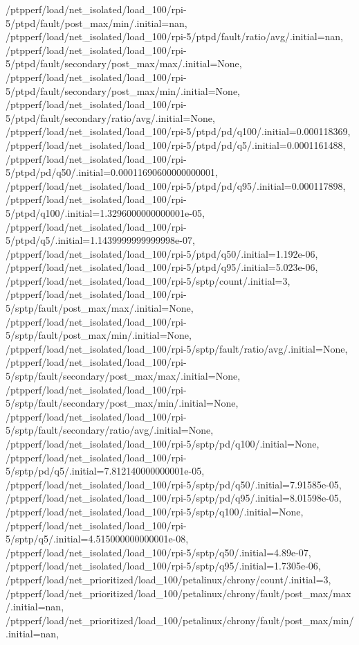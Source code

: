 {    /ptpperf/load/net_isolated/load_100/rpi-5/ptpd/fault/post_max/min/.initial=nan,
    /ptpperf/load/net_isolated/load_100/rpi-5/ptpd/fault/ratio/avg/.initial=nan,
    /ptpperf/load/net_isolated/load_100/rpi-5/ptpd/fault/secondary/post_max/max/.initial=None,
    /ptpperf/load/net_isolated/load_100/rpi-5/ptpd/fault/secondary/post_max/min/.initial=None,
    /ptpperf/load/net_isolated/load_100/rpi-5/ptpd/fault/secondary/ratio/avg/.initial=None,
    /ptpperf/load/net_isolated/load_100/rpi-5/ptpd/pd/q100/.initial=0.000118369,
    /ptpperf/load/net_isolated/load_100/rpi-5/ptpd/pd/q5/.initial=0.0001161488,
    /ptpperf/load/net_isolated/load_100/rpi-5/ptpd/pd/q50/.initial=0.00011690600000000001,
    /ptpperf/load/net_isolated/load_100/rpi-5/ptpd/pd/q95/.initial=0.000117898,
    /ptpperf/load/net_isolated/load_100/rpi-5/ptpd/q100/.initial=1.3296000000000001e-05,
    /ptpperf/load/net_isolated/load_100/rpi-5/ptpd/q5/.initial=1.1439999999999998e-07,
    /ptpperf/load/net_isolated/load_100/rpi-5/ptpd/q50/.initial=1.192e-06,
    /ptpperf/load/net_isolated/load_100/rpi-5/ptpd/q95/.initial=5.023e-06,
    /ptpperf/load/net_isolated/load_100/rpi-5/sptp/count/.initial=3,
    /ptpperf/load/net_isolated/load_100/rpi-5/sptp/fault/post_max/max/.initial=None,
    /ptpperf/load/net_isolated/load_100/rpi-5/sptp/fault/post_max/min/.initial=None,
    /ptpperf/load/net_isolated/load_100/rpi-5/sptp/fault/ratio/avg/.initial=None,
    /ptpperf/load/net_isolated/load_100/rpi-5/sptp/fault/secondary/post_max/max/.initial=None,
    /ptpperf/load/net_isolated/load_100/rpi-5/sptp/fault/secondary/post_max/min/.initial=None,
    /ptpperf/load/net_isolated/load_100/rpi-5/sptp/fault/secondary/ratio/avg/.initial=None,
    /ptpperf/load/net_isolated/load_100/rpi-5/sptp/pd/q100/.initial=None,
    /ptpperf/load/net_isolated/load_100/rpi-5/sptp/pd/q5/.initial=7.812140000000001e-05,
    /ptpperf/load/net_isolated/load_100/rpi-5/sptp/pd/q50/.initial=7.91585e-05,
    /ptpperf/load/net_isolated/load_100/rpi-5/sptp/pd/q95/.initial=8.01598e-05,
    /ptpperf/load/net_isolated/load_100/rpi-5/sptp/q100/.initial=None,
    /ptpperf/load/net_isolated/load_100/rpi-5/sptp/q5/.initial=4.515000000000001e-08,
    /ptpperf/load/net_isolated/load_100/rpi-5/sptp/q50/.initial=4.89e-07,
    /ptpperf/load/net_isolated/load_100/rpi-5/sptp/q95/.initial=1.7305e-06,
    /ptpperf/load/net_prioritized/load_100/petalinux/chrony/count/.initial=3,
    /ptpperf/load/net_prioritized/load_100/petalinux/chrony/fault/post_max/max/.initial=nan,
    /ptpperf/load/net_prioritized/load_100/petalinux/chrony/fault/post_max/min/.initial=nan,
}
